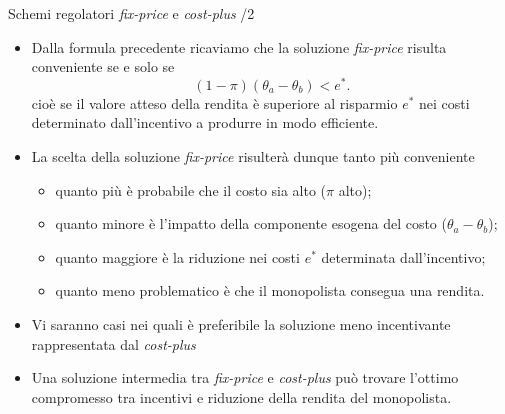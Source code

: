 \documentclass[aspectratio=64,12pt]{beamer}
\begin{document}
\begin{frame}{Schemi regolatori \emph{fix-price} e \emph{cost-plus} /2}
\begin{itemize}
\item Dalla formula precedente ricaviamo che la soluzione \emph{fix-price} risulta
conveniente se e solo se
\begin{equation*}
   (1-\pi)(\theta_a-\theta_b)<e^*.
\end{equation*}
cioè se il valore atteso della rendita è superiore al risparmio $e^*$ nei
costi determinato dall'incentivo a produrre in modo efficiente.
\item La scelta della soluzione \emph{fix-price} risulterà dunque tanto più
conveniente
\begin{itemize}
\item quanto più è probabile che il costo sia alto ($\pi$ alto);
\item quanto minore è l'impatto della componente esogena del costo ($\theta_a-\theta_b$);
\item quanto maggiore è la riduzione nei costi $e^*$ determinata dall'incentivo;
\item quanto meno problematico è che il monopolista consegua
una rendita.
\end{itemize}
\item Vi saranno casi nei quali è preferibile la soluzione meno incentivante rappresentata dal \emph{cost-plus}
\item Una soluzione intermedia tra \emph{fix-price} e
\emph{cost-plus} può trovare l'ottimo compromesso tra incentivi e riduzione della
rendita del monopolista.
\end{itemize}
\end{frame}
\end{document}
